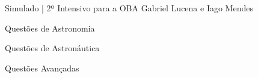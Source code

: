 \documentclass{../lista}
\begin{document}
	\cabecalhoAlt
		{Simulado | 2º Intensivo para a OBA}
		{}
		{Gabriel Lucena e Iago Mendes}


	\begin{secao}{Questões de Astronomia}
	\end{secao}

	\begin{secao}{Questões de Astronáutica}
	\end{secao}

	\begin{secao}{Questões Avançadas}
	\end{secao}
\end{document}

